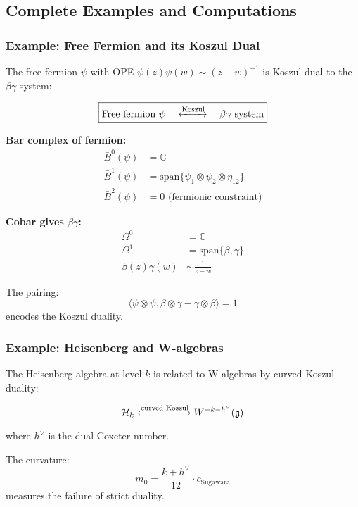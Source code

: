 \subsection{Complete Examples and Computations}

\subsubsection{Example: Free Fermion and its Koszul Dual}

\begin{example}
The free fermion $\psi$ with OPE $\psi(z)\psi(w) \sim (z-w)^{-1}$ is Koszul dual to the $\beta\gamma$ system:

$$\boxed{\text{Free fermion } \psi \quad \xleftrightarrow{\text{Koszul}} \quad \beta\gamma \text{ system}}$$

\textbf{Bar complex of fermion:}
\begin{align}
\bar{B}^0(\psi) &= \mathbb{C} \\
\bar{B}^1(\psi) &= \text{span}\{\psi_1 \otimes \psi_2 \otimes \eta_{12}\} \\
\bar{B}^2(\psi) &= 0 \text{ (fermionic constraint)}
\end{align}

\textbf{Cobar gives $\beta\gamma$:}
\begin{align}
\Omega^0 &= \mathbb{C} \\
\Omega^1 &= \text{span}\{\beta, \gamma\} \\
\beta(z)\gamma(w) &\sim \frac{1}{z-w}
\end{align}

The pairing:
$$\langle \psi \otimes \psi, \beta \otimes \gamma - \gamma \otimes \beta \rangle = 1$$
encodes the Koszul duality.
\end{example}

\subsubsection{Example: Heisenberg and W-algebras}

\begin{example}
The Heisenberg algebra at level $k$ is related to W-algebras by curved Koszul duality:

$$\mathcal{H}_k \xleftrightarrow{\text{curved Koszul}} W^{-k-h^\vee}(\mathfrak{g})$$

where $h^\vee$ is the dual Coxeter number.

The curvature:
$$m_0 = \frac{k + h^\vee}{12} \cdot c_{\text{Sugawara}}$$
measures the failure of strict duality.
\end{example}

